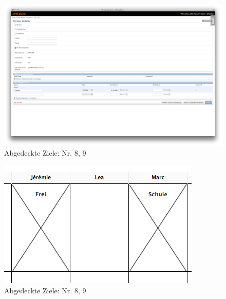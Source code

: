 \begin{figure}[htbp]
    \centering
        \includegraphics[height=0.85\textwidth,angle=90]{bilder/testing/Sperrtag_erstellen.png}
    \caption{Abgedeckte Ziele: Nr. 8, 9}
    \label{fig:bilder_testing_Sperrtag_erstellen}
\end{figure}
\begin{figure}[htbp]
    \centering
        \includegraphics[height=0.85\textwidth,angle=90]{bilder/testing/Sperrtag_Person_zuweisen.png}
    \caption{Abgedeckte Ziele: Nr. 8, 9}
    \label{fig:bilder_testing_Sperrtag_Person_zuweisen}
\end{figure}
